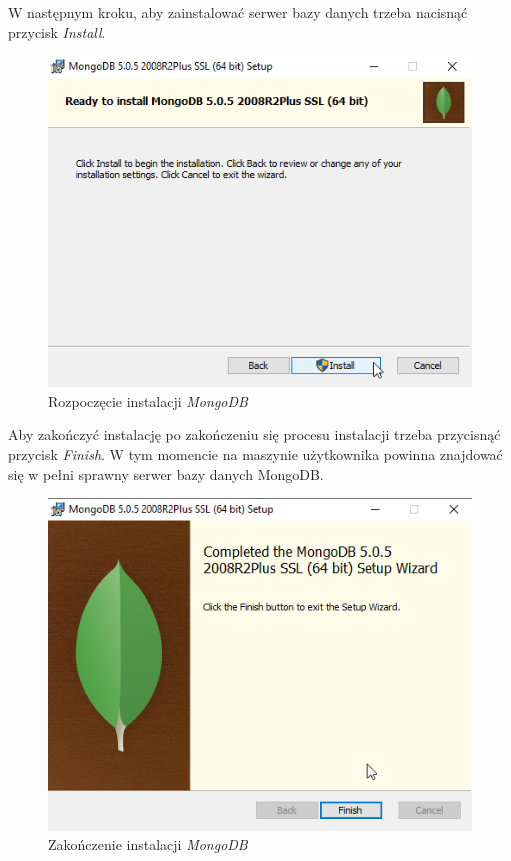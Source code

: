 \documentclass[a4paper,twoside,12pt]{book}
\begin{document}
W następnym kroku, aby zainstalować serwer bazy danych trzeba nacisnąć przycisk \textit{Install}.
\FloatBarrier
\begin{figure}[H]
	\centering
	\includegraphics[width=0.7\linewidth]{../zrzuty_ekranu/instalcja_mongodb/mongodb6}
	\caption{Rozpoczęcie instalacji \textit{MongoDB}}
	\label{fig:mongodb6}
\end{figure}
\afterpage{\clearpage}
\FloatBarrier

Aby zakończyć instalację po zakończeniu się procesu instalacji trzeba przycisnąć przycisk \textit{Finish}. W tym momencie na maszynie użytkownika powinna znajdować się w pełni sprawny serwer bazy danych MongoDB.
\FloatBarrier
\begin{figure}[H]
	\centering
	\includegraphics[width=0.7\linewidth]{../zrzuty_ekranu/instalcja_mongodb/mongodb_finish}
	\caption{Zakończenie instalacji \textit{MongoDB}}
	\label{fig:mongodbfinish}
\end{figure}
\afterpage{\clearpage}
\FloatBarrier
\end{document}
